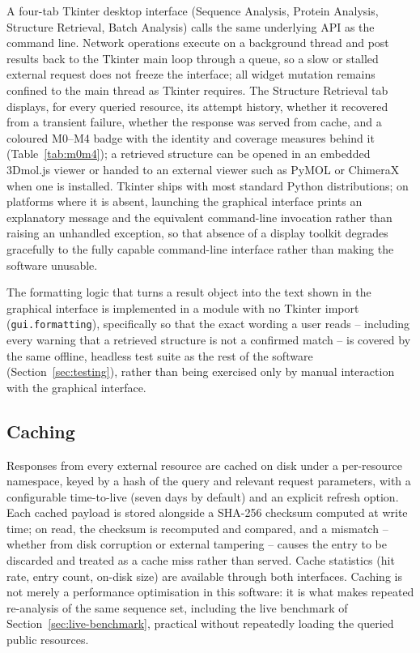 A four-tab Tkinter desktop interface (Sequence Analysis, Protein Analysis,
Structure Retrieval, Batch Analysis) calls the same underlying API as the
command line. Network operations execute on a background thread and post
results back to the Tkinter main loop through a queue, so a slow or stalled
external request does not freeze the interface; all widget mutation remains
confined to the main thread as Tkinter requires. The Structure Retrieval tab
displays, for every queried resource, its attempt history, whether it
recovered from a transient failure, whether the response was served from
cache, and a coloured M0--M4 badge with the identity and coverage measures
behind it (Table~\ref{tab:m0m4}); a retrieved structure can be opened in an
embedded 3Dmol.js \citep{rego20153dmol} viewer or handed to an external
viewer such as PyMOL \citep{pymol} or ChimeraX
\citep{pettersen2021chimerax} when one is installed. Tkinter ships with most
standard Python distributions; on platforms where it is absent, launching
the graphical interface prints an explanatory message and the equivalent
command-line invocation rather than raising an unhandled exception, so that
absence of a display toolkit degrades gracefully to the fully capable
command-line interface rather than making the software unusable.

The formatting logic that turns a result object into the text shown in the
graphical interface is implemented in a module with no Tkinter import
(\texttt{gui.formatting}), specifically so that the exact wording a user
reads -- including every warning that a retrieved structure is not a
confirmed match -- is covered by the same offline, headless test suite as
the rest of the software (Section~\ref{sec:testing}), rather than being
exercised only by manual interaction with the graphical interface.

\subsection{Caching}
\label{sec:caching}

Responses from every external resource are cached on disk under a
per-resource namespace, keyed by a hash of the query and relevant request
parameters, with a configurable time-to-live (seven days by default) and an
explicit refresh option. Each cached payload is stored alongside a SHA-256
checksum computed at write time; on read, the checksum is recomputed and
compared, and a mismatch -- whether from disk corruption or external
tampering -- causes the entry to be discarded and treated as a cache miss
rather than served. Cache statistics (hit rate, entry count, on-disk size)
are available through both interfaces. Caching is not merely a performance
optimisation in this software: it is what makes repeated re-analysis of the
same sequence set, including the live benchmark of
Section~\ref{sec:live-benchmark}, practical without repeatedly loading the
queried public resources.

